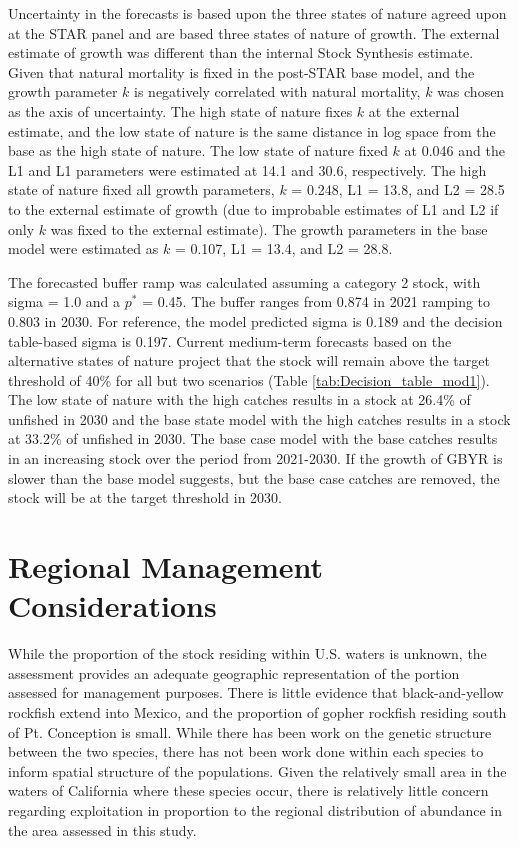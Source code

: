 \documentclass[12pt,]{article}
\begin{document}
Uncertainty in the forecasts is based upon the three states of nature
agreed upon at the STAR panel and are based three states of nature of
growth. The external estimate of growth was different than the internal
Stock Synthesis estimate. Given that natural mortality is fixed in the
post-STAR base model, and the growth parameter \(k\) is negatively
correlated with natural mortality, \(k\) was chosen as the axis of
uncertainty. The high state of nature fixes \(k\) at the external
estimate, and the low state of nature is the same distance in log space
from the base as the high state of nature. The low state of nature fixed
\(k\) at 0.046 and the L1 and L1 parameters were estimated at 14.1 and
30.6, respectively. The high state of nature fixed all growth
parameters, \(k\) = 0.248, L1 = 13.8, and L2 = 28.5 to the external
estimate of growth (due to improbable estimates of L1 and L2 if only
\(k\) was fixed to the external estimate). The growth parameters in the
base model were estimated as \(k\) = 0.107, L1 = 13.4, and L2 = 28.8.

The forecasted buffer ramp was calculated assuming a category 2 stock,
with sigma = 1.0 and a \(p^*\) = 0.45. The buffer ranges from 0.874 in
2021 ramping to 0.803 in 2030. For reference, the model predicted sigma
is 0.189 and the decision table-based sigma is 0.197. Current
medium-term forecasts based on the alternative states of nature project
that the stock will remain above the target threshold of 40\% for all
but two scenarios (Table \ref{tab:Decision_table_mod1}). The low state
of nature with the high catches results in a stock at 26.4\% of unfished
in 2030 and the base state model with the high catches results in a
stock at 33.2\% of unfished in 2030. The base case model with the base
catches results in an increasing stock over the period from 2021-2030.
If the growth of GBYR is slower than the base model suggests, but the
base case catches are removed, the stock will be at the target threshold
in 2030.

\section{Regional Management
Considerations}\label{regional-management-considerations}

While the proportion of the stock residing within U.S. waters is
unknown, the assessment provides an adequate geographic representation
of the portion assessed for management purposes. There is little
evidence that black-and-yellow rockfish extend into Mexico, and the
proportion of gopher rockfish residing south of Pt. Conception is small.
While there has been work on the genetic structure between the two
species, there has not been work done within each species to inform
spatial structure of the populations. Given the relatively small area in
the waters of California where these species occur, there is relatively
little concern regarding exploitation in proportion to the regional
distribution of abundance in the area assessed in this study.
\end{document}
